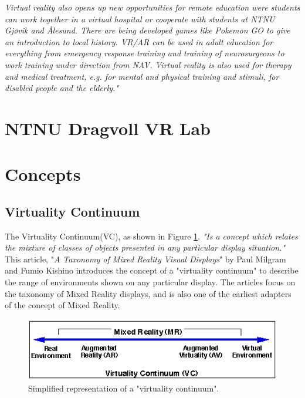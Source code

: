             \emph{Virtual reality also opens up new opportunities for remote education were students can work together in a virtual hospital or cooperate with students at NTNU Gjøvik and Ålesund. There are being developed games like Pokemon GO to give an introduction to local history. VR/AR can be used in adult education for everything from emergency response training and training of neurosurgeons to work training under direction from NAV. Virtual reality is also used for therapy and medical treatment, e.g. for mental and physical training and stimuli, for disabled people and the elderly."} \cite{EiTVRLandsby}
        
    \section{NTNU Dragvoll VR Lab}

    \section{Concepts}
    
        \subsection{Virtuality Continuum}
            The Virtuality Continuum(VC), as shown in Figure \ref{fig:virtualcontinuum}. \emph{"Is a concept which relates the mixture of classes of objects presented in any particular display situation."}\cite{Milgram1994} This article, "\emph{A Taxonomy of Mixed Reality Visual Displays}" by Paul Milgram and Fumio Kishino\cite{Milgram1994} introduces the concept of a "virtuality continuum" to describe the range of environments shown on any particular display. The articles focus on the taxonomy of Mixed Reality displays, and is also one of the earliest adapters of the concept of Mixed Reality.
            \begin{figure}[!ht]
                \centering
                \includegraphics[scale=1]{figures/virtualcontinuum.png}
                \caption{Simplified representation of a "virtuality continuum".\cite{Milgram1994}}
                \label{fig:virtualcontinuum}
            \end{figure}
        
